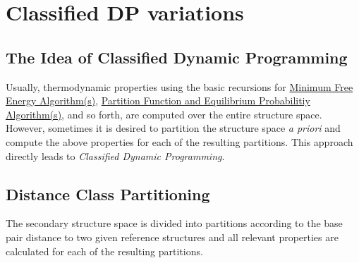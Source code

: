 \hypertarget{classified_dp}{}\section{Classified DP variations}\label{classified_dp}
\hypertarget{classified_dp_classified_dp_intro}{}\subsection{The Idea of Classified Dynamic Programming}\label{classified_dp_classified_dp_intro}
Usually, thermodynamic properties using the basic recursions for \hyperlink{mfe_algorithm}{Minimum Free Energy Algorithm(s)}, \hyperlink{pf_algorithm}{Partition Function and Equilibrium Probabilitiy Algorithm(s)}, and so forth, are computed over the entire structure space. However, sometimes it is desired to partition the structure space {\itshape a priori} and compute the above properties for each of the resulting partitions. This approach directly leads to {\itshape Classified Dynamic Programming}.\hypertarget{classified_dp_distance_classes}{}\subsection{Distance Class Partitioning}\label{classified_dp_distance_classes}
The secondary structure space is divided into partitions according to the base pair distance to two given reference structures and all relevant properties are calculated for each of the resulting partitions.

